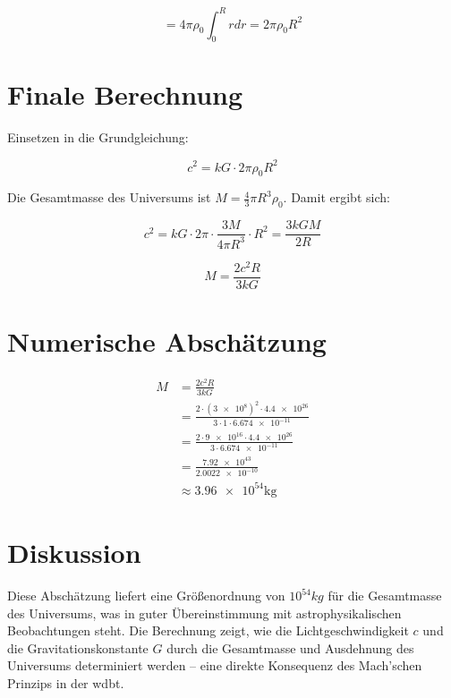 \begin{equation}
    = 4\pi \rho_0 \int_0^R r  dr = 2\pi \rho_0 R^2
\end{equation}

\section{Finale Berechnung}
Einsetzen in die Grundgleichung:

\begin{equation}
    c^2 = k G \cdot 2\pi \rho_0 R^2
\end{equation}

Die Gesamtmasse des Universums ist $M = \frac{4}{3} \pi R^3 \rho_0$. Damit ergibt sich:

\begin{equation}
    c^2 = k G \cdot 2\pi \cdot \frac{3M}{4\pi R^3} \cdot R^2 = \frac{3k G M}{2 R}
\end{equation}

\begin{equation}
    M = \frac{2 c^2 R}{3k G}
\end{equation}

\section{Numerische Abschätzung}
\begin{align}
M &= \frac{2 c^2 R}{3k G} \\
  &= \frac{2 \cdot (\num{3e8})^2 \cdot \num{4.4e26}}{3 \cdot 1 \cdot \num{6.674e-11}} \\
  &= \frac{2 \cdot \num{9e16} \cdot \num{4.4e26}}{3 \cdot \num{6.674e-11}} \\
  &= \frac{\num{7.92e43}}{\num{2.0022e-10}} \\
  &\approx \num{3.96e54}  \si{\kilo\gram}
\end{align}

\section{Diskussion}
Diese Abschätzung liefert eine Größenordnung von $10^{54} kg$ für die Gesamtmasse des Universums, was in guter Übereinstimmung mit astrophysikalischen Beobachtungen steht. Die Berechnung zeigt, wie die
Lichtgeschwindigkeit $c$ und die Gravitationskonstante $G$ durch die Gesamtmasse und Ausdehnung des Universums determiniert werden – eine direkte Konsequenz des Mach'schen Prinzips in der \gls{wdbt}.

